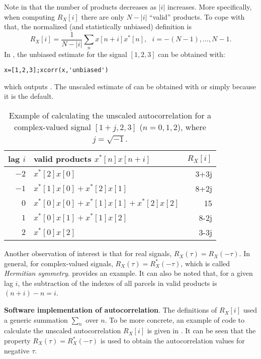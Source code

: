 Note in  that the number of products decreases as $|i|$ increases. More specifically, when computing $R_X[i]$ there are only $N-|i|$ ``valid'' products. To cope with that, the normalized (and statistically unbiased) definition is
\begin{equation}
R_X[i] = \frac 1 {N-|i|} \sum_n x[n+i] x^*[n],~~~ i=-(N-1),\ldots,N-1.
\label{eq:discrete_time_unbiased_acf}
\end{equation}
In {\matlab}, the unbiased estimate for the signal $[1,2,3]$ can be obtained with:
\begin{lstlisting}
x=[1,2,3];xcorr(x,'unbiased')
\end{lstlisting}
which outputs \co{[3,4,4.67,4,3]}. The unscaled estimate of  can be obtained with  or simply  because it is the default.

\begin{table}
 \centering
 \caption{Example of calculating the unscaled autocorrelation for a complex-valued signal $[1+j,2,3]$ ($n=0,1,2$), where $j=\sqrt{-1}$. \label{tab:complex_autocorrelation}}
 \begin{tabularx}{\textwidth}{rXr}
 \toprule
 lag $i$ & valid products $x^*[n]x[n+i]$ & $R_X[i]$ \\ \midrule
 $-2$ & $x^*[2] x[0]$ &  3+3j \\
 $-1$ & $x^*[1] x[0] + x^*[2] x[1] $ & 8+2j \\
 $0$ & $x^*[0] x[0] + x^*[1] x[1] + x^*[2] x[2] $ & 15 \\
 $1$ & $x^*[0] x[1] + x^*[1] x[2] $ & 8-2j \\
 $2$ & $x^*[0] x[2]$ &  3-3j \\\bottomrule
\end{tabularx}
\end{table}

Another observation of interest is that for real signals, $R_X(\tau) = R_X(-\tau)$. In general, for complex-valued signals, $R_X(\tau) = R_X^*(-\tau)$, which is called \emph{Hermitian symmetry}.  provides an example. It can also be noted that, for a given lag $i$, the subtraction of the indexes of all parcels in valid products is $(n+i)-n=i$.

\bExample \textbf{Software implementation of autocorrelation}.
The definitions of $R_X[i]$ used a generic summation $\sum_n$ over $n$. To be more concrete, an example of {\matlab} code to calculate the unscaled autocorrelation $R_X[i]$ is given in . It can be seen that the property $R_X(\tau) = R_X^*(-\tau)$ is used to obtain the autocorrelation values for negative $\tau$.


